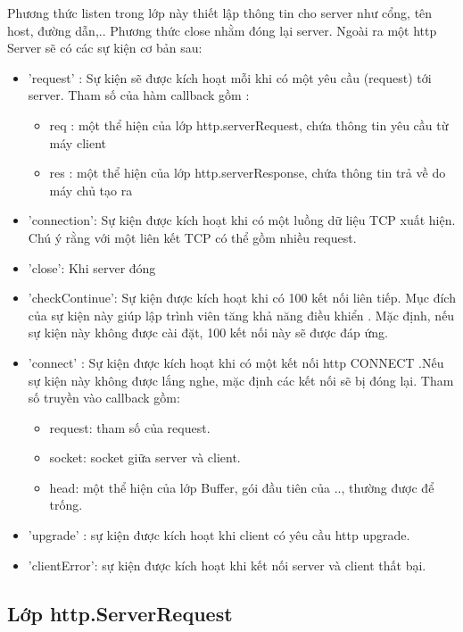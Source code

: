 		Phương thức listen trong lớp này thiết lập thông tin cho server như cổng, tên host, đường dẫn,.. Phương thức close nhằm đóng lại server. Ngoài ra một http Server sẽ có các sự kiện cơ bản sau:
		
		\begin{itemize}
			\item 'request' : Sự kiện sẽ được kích hoạt mỗi khi có một yêu cầu (request) tới server. Tham số của hàm callback gồm :
				\begin{itemize}
					\item req : một thể hiện của lớp http.serverRequest, chứa thông tin yêu cầu từ máy client
					\item res : một thể hiện của lớp http.serverResponse, chứa thông tin trả về do máy chủ tạo ra
				\end{itemize}
			\item 'connection': Sự kiện được kích hoạt khi có một luồng dữ liệu TCP xuất hiện. Chú ý rằng với một liên kết TCP có thể gồm nhiều request.
			\item 'close': Khi server đóng
			\item 'checkContinue': Sự kiện được kích hoạt khi có 100  kết nối liên tiếp. Mục đích của sự kiện này giúp lập trình viên tăng khả năng điều khiển . Mặc định, nếu sự kiện này không được cài đặt, 100 kết nối này sẽ được đáp ứng.
			\item 'connect' : Sự kiện được kích hoạt khi có một kết nối http CONNECT .Nếu sự kiện này không được  lắng nghe, mặc định các kết nối sẽ bị đóng lại. Tham số truyền vào callback gồm:
			\begin{itemize}
				\item request: tham số của request.
				\item socket: socket giữa server và client.
				\item head: một thể hiện của lớp Buffer, gói đầu tiên của .., thường được để trống.
			\end{itemize}

			\item 'upgrade' : sự kiện được kích hoạt khi client có yêu cầu http upgrade.
			\item 'clientError': sự kiện được kích hoạt khi kết nối server và client thất bại.
		\end{itemize}
		
	\subsection{Lớp http.ServerRequest}
		
